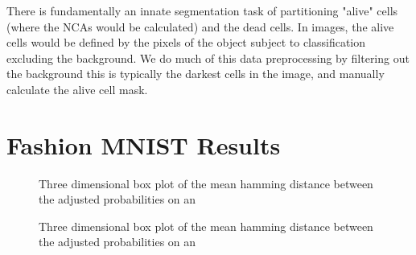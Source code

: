 \documentclass[conference]{IEEEtran}
\begin{document}
There is fundamentally an innate segmentation task of partitioning "alive" cells (where the NCAs would be calculated) and the dead cells. In images, the alive cells would be defined by the pixels of the object subject to classification excluding the background. We do much of this data preprocessing by filtering out the background this is typically the darkest cells in the image, and manually calculate the alive cell mask.


\section{Fashion MNIST Results}

\begin{figure}[htbp]
\caption{Three dimensional box plot of the mean hamming distance between the adjusted probabilities on an }
\end{figure}


\begin{figure}[htbp]
\caption{Three dimensional box plot of the mean hamming distance between the adjusted probabilities on an }
\end{figure}
\end{document}
